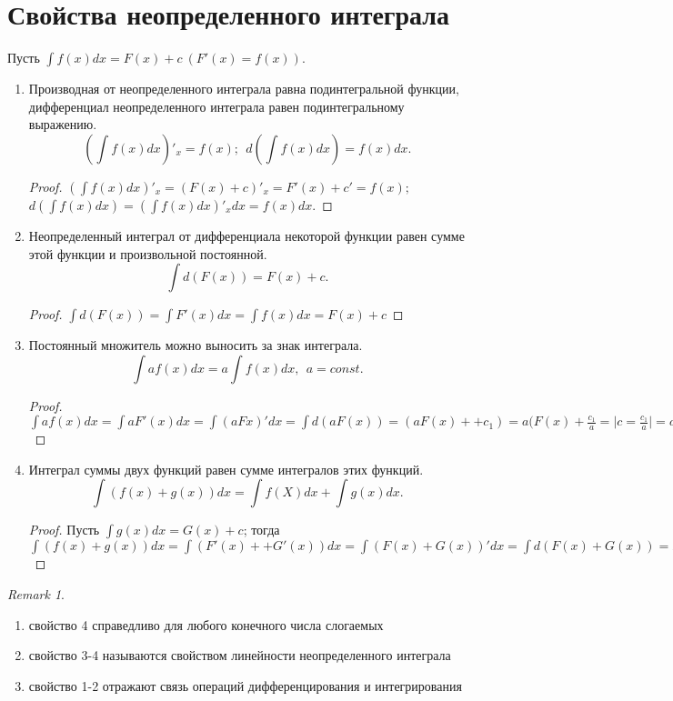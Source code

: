 \documentclass[a4paper,12pt]{bookest}
\theoremstyle{remark}
\newtheorem*{remark}{Remark}
\begin{document}
\section{Свойства неопределенного интеграла}
Пусть $\int f(x)dx=F(x)+c\>(F'(x)=f(x))$.
\begin{enumerate}
	\item Производная от неопределенного интеграла равна подинтегральной функции, дифференциал неопределенного интеграла равен подинтегральному выражению. \\
	$$(\int f(x)dx)'_x=f(x);\>\> d(\int f(x)dx)=f(x)dx.$$
	\begin{proof}
		$(\int f(x)dx)'_x=(F(x)+c)'_x=F'(x)+c'=f(x);$	\\$d(\int f(x)dx)=(\int f(x)dx)'_xdx=f(x)dx$.
	\end{proof}
	\item Неопределенный интеграл от дифференциала некоторой функции равен сумме этой функции и произвольной постоянной.
	$$\int d(F(x))=F(x)+c.$$
	\begin{proof}
		$\int d(F(x))=\int F'(x)dx=\int f(x)dx=F(x)+c$
	\end{proof}
	\item Постоянный множитель можно выносить за знак интеграла.
	$$\int af(x)dx=a\int f(x)dx,\>\> a=const.$$
	\begin{proof}
		$\int af(x)dx=\int a F'(x)dx=\int(aFx)'dx=\int d(aF(x))=(aF(x)++c_1)=a(F(x)+\frac{c_1}{a}=\Big|c=\frac{c_1}{a}\Big|=a(f(x)+c)=a\int f(x)dx$
	\end{proof}
	\item Интеграл суммы двух функций равен сумме интегралов этих функций.
	$$\int(f(x)+g(x))dx=\int f(X)dx+\int g(x)dx.$$
	\begin{proof}
		Пусть $\int g(x)dx=G(x)+c$; тогда $\int(f(x)+g(x))dx=\int(F'(x)++G'(x))dx=\int(F(x)+G(x))'dx=\int d(F(x)+G(x))=F(x)+G(x)++c=\Big|c=c_1+c_2\Big|=(F(x)+c_1)+(G(x)c_2)=\int f(x)dx+\int g(x)dx$
	\end{proof}
\end{enumerate}
\begin{remark}\
	\begin{enumerate}
		\item[-]свойство 4 справедливо для любого конечного числа слогаемых 
		\item[-]свойство 3-4 называются свойством линейности неопределенного интеграла 
		\item[-]свойство 1-2 отражают связь операций дифференцирования и интегрирования  
	\end{enumerate}		
\end{remark}
\end{document}
